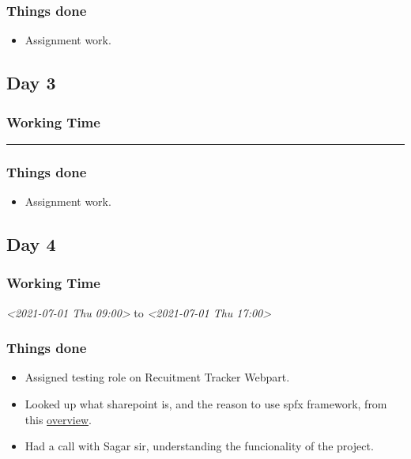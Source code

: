 \documentclass[11pt]{article}
\begin{document}
\subsubsection*{Things done}
\label{sec:org84b77db}
\begin{itemize}
\item Assignment work.
\end{itemize}

\subsection*{Day 3}
\label{sec:org9a3446f}

\subsubsection*{Working Time}
\label{sec:org5111a6c}
\noindent\rule{\textwidth}{0.5pt}

\subsubsection*{Things done}
\label{sec:org305aa62}
\begin{itemize}
\item Assignment work.
\end{itemize}

\subsection*{Day 4}
\label{sec:org50e06f6}
\subsubsection*{Working Time}
\label{sec:orgbebd3a7}
\textit{<2021-07-01 Thu 09:00> } to \textit{<2021-07-01 Thu 17:00>}

\subsubsection*{Things done}
\label{sec:org5a38303}
\begin{itemize}
\item Assigned testing role on Recuitment Tracker Webpart.
\item Looked up what sharepoint is, and the reason to use spfx framework, from this \href{https://docs.microsoft.com/en-us/sharepoint/dev/spfx/sharepoint-framework-overview}{overview}.
\item Had a call with Sagar sir, understanding the funcionality of the project.
\end{itemize}
\end{document}
